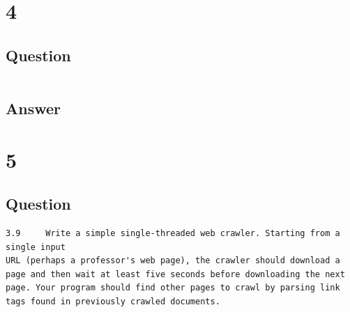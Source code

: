 \documentclass[letterpaper,11pt]{article}
\newcommand*{\srcPath}{../src}%
\begin{document}
 

\clearpage


\section*{4}

\subsection*{Question}

\begin{verbatim}

\end{verbatim}

\subsection*{Answer}

\begin{center}

\end{center}


\clearpage


\section*{5}

\subsection*{Question}

\begin{verbatim}
3.9 	Write a simple single-threaded web crawler. Starting from a single input 
URL (perhaps a professor's web page), the crawler should download a 
page and then wait at least five seconds before downloading the next 
page. Your program should find other pages to crawl by parsing link 
tags found in previously crawled documents.
\end{verbatim}
\end{document}
